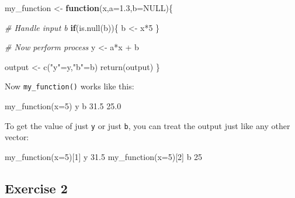 \documentclass[
]{book}
\newenvironment{Shaded}{\begin{snugshade}}{\end{snugshade}}
\newcommand{\AttributeTok}[1]{\textcolor[rgb]{0.77,0.63,0.00}{#1}}
\newcommand{\CommentTok}[1]{\textcolor[rgb]{0.56,0.35,0.01}{\textit{#1}}}
\newcommand{\ConstantTok}[1]{\textcolor[rgb]{0.00,0.00,0.00}{#1}}
\newcommand{\ControlFlowTok}[1]{\textcolor[rgb]{0.13,0.29,0.53}{\textbf{#1}}}
\newcommand{\DecValTok}[1]{\textcolor[rgb]{0.00,0.00,0.81}{#1}}
\newcommand{\FloatTok}[1]{\textcolor[rgb]{0.00,0.00,0.81}{#1}}
\newcommand{\FunctionTok}[1]{\textcolor[rgb]{0.00,0.00,0.00}{#1}}
\newcommand{\NormalTok}[1]{#1}
\newcommand{\OtherTok}[1]{\textcolor[rgb]{0.56,0.35,0.01}{#1}}
\newcommand{\SpecialCharTok}[1]{\textcolor[rgb]{0.00,0.00,0.00}{#1}}
\newcommand{\StringTok}[1]{\textcolor[rgb]{0.31,0.60,0.02}{#1}}
\begin{document}
\begin{Shaded}
\begin{Highlighting}[]
\NormalTok{my\_function }\OtherTok{\textless{}{-}} \ControlFlowTok{function}\NormalTok{(x,}\AttributeTok{a=}\FloatTok{1.3}\NormalTok{,}\AttributeTok{b=}\ConstantTok{NULL}\NormalTok{)\{}
  
  \CommentTok{\# Handle input \textasciigrave{}b\textasciigrave{}}
  \ControlFlowTok{if}\NormalTok{(}\FunctionTok{is.null}\NormalTok{(b))\{}
\NormalTok{    b }\OtherTok{\textless{}{-}}\NormalTok{ x}\SpecialCharTok{*}\DecValTok{5}
\NormalTok{  \}}
  
  \CommentTok{\# Now perform process}
\NormalTok{  y }\OtherTok{\textless{}{-}}\NormalTok{ a}\SpecialCharTok{*}\NormalTok{x }\SpecialCharTok{+}\NormalTok{ b}
  
\NormalTok{  output }\OtherTok{\textless{}{-}} \FunctionTok{c}\NormalTok{(}\StringTok{"y"}\OtherTok{=}\NormalTok{y,}\StringTok{"b"}\OtherTok{=}\NormalTok{b) }
  \FunctionTok{return}\NormalTok{(output)}
\NormalTok{\}}
\end{Highlighting}
\end{Shaded}

Now \texttt{my\_function()} works like this:

\begin{Shaded}
\begin{Highlighting}[]
\FunctionTok{my\_function}\NormalTok{(}\AttributeTok{x=}\DecValTok{5}\NormalTok{)}
\NormalTok{   y    b }
\FloatTok{31.5} \FloatTok{25.0} 
\end{Highlighting}
\end{Shaded}

To get the value of just \texttt{y} or just \texttt{b}, you can treat the output just like any other vector:

\begin{Shaded}
\begin{Highlighting}[]
\FunctionTok{my\_function}\NormalTok{(}\AttributeTok{x=}\DecValTok{5}\NormalTok{)[}\DecValTok{1}\NormalTok{]}
\NormalTok{   y }
\FloatTok{31.5} 
\FunctionTok{my\_function}\NormalTok{(}\AttributeTok{x=}\DecValTok{5}\NormalTok{)[}\DecValTok{2}\NormalTok{]}
\NormalTok{ b }
\DecValTok{25} 
\end{Highlighting}
\end{Shaded}

\hypertarget{exercise-2-8}{%
\subsection*{Exercise 2}\label{exercise-2-8}}
\end{document}
